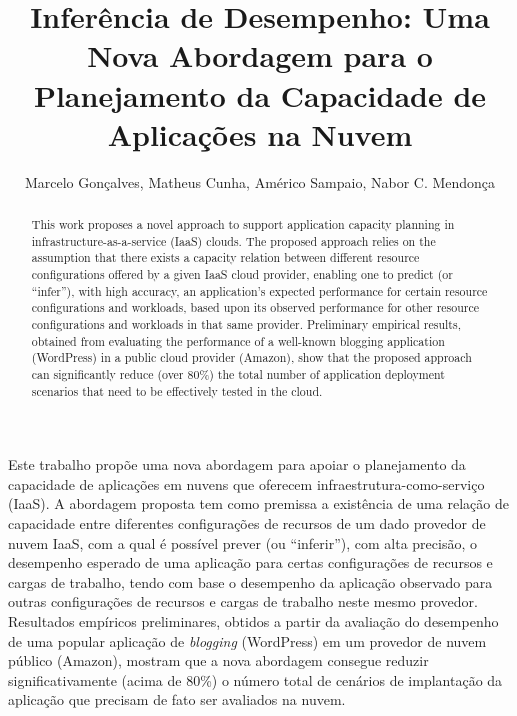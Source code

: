 \documentclass[12pt]{article}
\title{Inferência de Desempenho: Uma Nova Abordagem para o Planejamento da Capacidade de Aplicações na Nuvem}
\author{Marcelo Gonçalves, Matheus Cunha, Américo Sampaio, Nabor C. Mendonça}
\begin{document}
 

\maketitle

\begin{resumo} 


Este trabalho propõe uma nova abordagem para apoiar o planejamento da capacidade de aplicações em nuvens que oferecem infraestrutura-como-serviço (IaaS). A abordagem proposta tem como premissa a existência de uma relação de capacidade entre diferentes configurações de recursos de um dado provedor de nuvem IaaS, com a qual é possível prever (ou ``inferir''), com alta precisão, o desempenho esperado de uma aplicação para certas configurações de recursos e cargas de trabalho, tendo com base o desempenho da aplicação observado para outras configurações de recursos e cargas de trabalho neste mesmo provedor. Resultados empíricos preliminares, obtidos a partir da avaliação do desempenho de uma popular aplicação de \emph{blogging} (WordPress) em um provedor de nuvem público (Amazon), mostram que a nova abordagem consegue reduzir significativamente (acima de 80\%) o número total de cenários de implantação da aplicação que precisam de fato ser avaliados na nuvem.

\end{resumo}

\begin{abstract}


This work proposes a novel approach to support application capacity planning in infrastructure-as-a-service (IaaS) clouds. The proposed approach relies on the assumption that there exists a capacity relation between different resource configurations offered by a given IaaS cloud provider, enabling one to predict (or ``infer''), with high accuracy, an application's expected performance for certain resource configurations and workloads, based upon its observed performance for other resource configurations and workloads in that same provider. Preliminary empirical results, obtained from evaluating the performance of a well-known blogging application (WordPress) in a public cloud provider (Amazon), show that the proposed approach can significantly reduce (over 80\%) the total number of application deployment scenarios that need to be effectively tested in the cloud.

\end{abstract}
\end{document}
